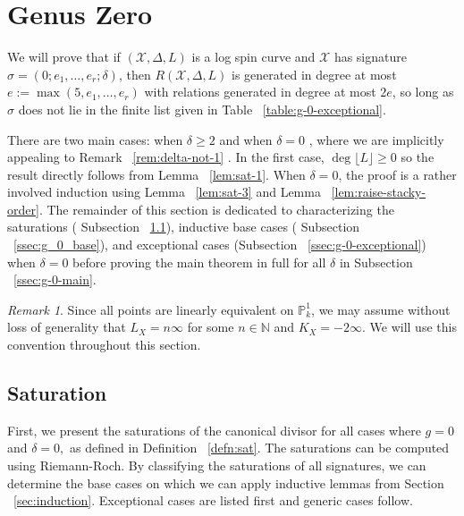 \documentclass{amsart}
\theoremstyle{plain}
\theoremstyle{definition}
\theoremstyle{remark}
\newtheorem{rem}[thm]{Remark}
\numberwithin{equation}{section}
\newcommand\ssec{\subsection}
\newcommand\BN{{\mathbb N}}
\newcommand\BP{{\mathbb P}}
\newcommand \sx{\mathscr X}
\newcommand{\halfcan}{L}
\begin{document}

\section{Genus Zero}
\label{sec:g_0}
We will prove that if $(\sx , \Delta, \halfcan)$ is a log spin curve and
$\sx$ has signature $\sigma = (0; e_1, \ldots , e_r; \delta)$,
then $R(\sx , \Delta, L)$ is generated in degree at most $e := \max(
5, e_1, \ldots, e_r)$ with relations generated in degree at most $2e
$, so long as $\sigma$ does not lie in the finite list given in Table ~\ref{table:g-0-exceptional}.

There are two main cases: when $\delta \geq 2$ and when $\delta = 0$
, where we are implicitly appealing to Remark ~\ref{rem:delta-not-1}
. In the first case, $\deg \lfloor \halfcan \rfloor \geq 0$ so the
result directly follows from Lemma ~\ref{lem:sat-1}. When $\delta =
0$, the proof is a rather involved induction using Lemma
~\ref{lem:sat-3} and Lemma ~\ref{lem:raise-stacky-order}. The
remainder of this section is dedicated to characterizing the
saturations ( Subsection ~\ref{ssec:g_0_saturation}), inductive
base cases ( Subsection ~\ref{ssec:g_0_base}), and exceptional
cases (Subsection ~\ref{ssec:g-0-exceptional}) when $\delta = 0$
before proving the main theorem in full for all $\delta$ in
Subsection ~\ref{ssec:g-0-main}.
 
\begin{rem}
Since all points are linearly equivalent on $\BP^1_k$, we may
assume without loss of generality that $L_X = n \infty$ for some $n
\in \BN$ and $K_X = -2 \infty$. We will use this convention
throughout this section.
\end{rem}

\ssec{Saturation}
\label{ssec:g_0_saturation}
First, we present the saturations of the canonical divisor for
all cases where $g = 0$ and $\delta = 0,$ as defined in Definition
~\ref{defn:sat}. The saturations can be computed using Riemann-Roch.
By classifying the saturations of all signatures, we can determine
the base cases on which we can apply inductive lemmas from
Section ~\ref{sec:induction}. Exceptional cases are listed first
and generic cases follow.
\end{document}
